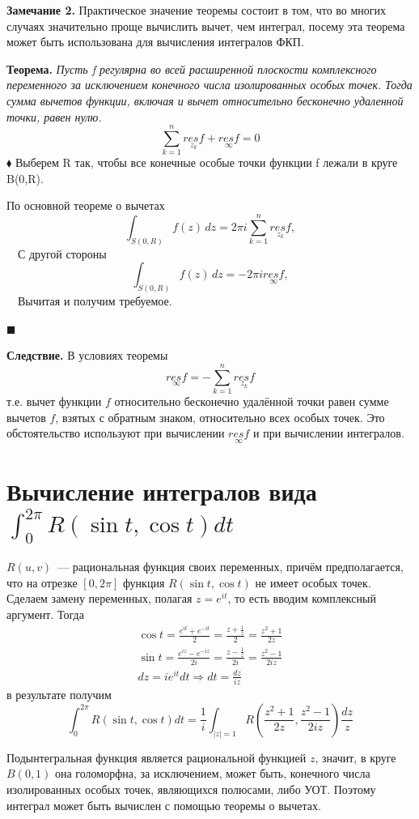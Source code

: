 \documentclass[a4paper, 12pt]{report}
\begin{document}
\textbf{Замечание 2.} \quad
Практическое значение теоремы состоит в том, что во многих случаях значительно проще вычислить вычет, чем интеграл, посему эта теорема может быть использована для вычисления интегралов ФКП.
\par\bigskip
\textbf{Теорема.} \quad 
\textit{Пусть f регулярна во всей расширенной плоскости комплексного переменного за исключением конечного числа изолированных особых точек.}
\textit{Тогда сумма вычетов функции, включая и вычет относительно бесконечно удаленной точки, равен нулю.
\[\sum_{k=1}^{n} \underset{\text{$z_k$}}{res f} + \underset{\text{$\infty$}}{res f}=0\]}\nextline
$\blacklozenge$\hspace{2 mm} Выберем R так, чтобы все конечные особые точки функции f лежали в круге B(0,R). \par\bigskip По основной теореме о вычетах \[
    \int_{S(0,R)}  f(z) \,dz = 2\pi i \sum_{k=1}^{n} \underset{\text{$z_k$}}{res f},
\]
$\quad$С другой стороны \[
    \int_{S(0,R)}  f(z) \,dz = -2\pi i  \underset{\infty}{res f},
\]
$\quad$Вычитая и получим требуемое.
\begin{flushright}$\blacksquare$\end{flushright}
\par\bigskip

\textbf{Следствие.} \quad
В условиях теоремы 
\[\underset{\text{$\infty$}}{res f}=-\sum_{k=1}^{n} \underset{\text{$z_k$}}{res f}\]
т.е. вычет функции $f$ относительно бесконечно удалённой точки равен сумме вычетов $f$, взятых с обратным знаком, относительно всех особых точек. Это обстоятельство используют при вычислении $\underset{\text{$\infty$}}{res f}$ и при вычислении интегралов.







\section{Вычисление интегралов вида $\displaystyle \int_0^{2\pi}R(\sin t, \cos t) dt$}
$R(u, v)$~--- рациональная функция своих переменных, причём предполагается, что на отрезке $[0, 2\pi]$ функция $R(\sin t, \cos t)$ не имеет особых точек. \\
Сделаем замену переменных, полагая $z = e^{it}$, то есть вводим комплексный аргумент.
Тогда 
\begin{gather*}
    \cos t = \frac{e^{it} + e^{-it}}{2} = \frac{z + \frac{1}{z}}{2} = \frac{z^2 + 1}{2z} \\
    \sin t = \frac{e^{iz} - e^{-iz}}{2i} = \frac{z - \frac{1}{z}}{2i} = \frac{z^2 - 1}{2iz} \\
    dz = ie^{it}dt \Rightarrow dt = \frac{dz}{iz}
\end{gather*}
 в результате получим
\[ \int_0^{2\pi}R (\sin t, \cos t) dt = \frac{1}{i} \int_{|z| = 1} R \left(\frac{z^2 + 1}{2z}, \frac{z^2 - 1}{2iz} \right)\frac{dz}{z} \]
\par Подынтегральная функция является рациональной функцией $z$, значит, в круге $B(0,1)$ она голоморфна, за исключением, может быть, конечного числа изолированных особых точек, являющихся полюсами, либо УОТ.
Поэтому интеграл может быть вычислен с помощью теоремы о вычетах.
\end{document}
